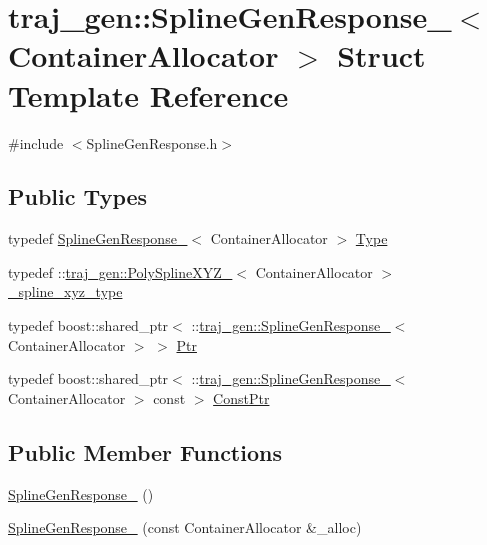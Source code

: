 \hypertarget{structtraj__gen_1_1_spline_gen_response__}{}\section{traj\+\_\+gen\+:\+:Spline\+Gen\+Response\+\_\+$<$ Container\+Allocator $>$ Struct Template Reference}
\label{structtraj__gen_1_1_spline_gen_response__}


{\ttfamily \#include $<$Spline\+Gen\+Response.\+h$>$}

\subsection*{Public Types}
\begin{DoxyCompactItemize}
\item 
typedef \hyperlink{structtraj__gen_1_1_spline_gen_response__}{Spline\+Gen\+Response\+\_\+}$<$ Container\+Allocator $>$ \hyperlink{structtraj__gen_1_1_spline_gen_response___a033ff4c35ebdd04211abb4cda0c40447}{Type}
\item 
typedef \+::\hyperlink{structtraj__gen_1_1_poly_spline_x_y_z__}{traj\+\_\+gen\+::\+Poly\+Spline\+X\+Y\+Z\+\_\+}$<$ Container\+Allocator $>$ \hyperlink{structtraj__gen_1_1_spline_gen_response___a2b22348645511f99126b3078bf1ae10d}{\+\_\+spline\+\_\+xyz\+\_\+type}
\item 
typedef boost\+::shared\+\_\+ptr$<$ \+::\hyperlink{structtraj__gen_1_1_spline_gen_response__}{traj\+\_\+gen\+::\+Spline\+Gen\+Response\+\_\+}$<$ Container\+Allocator $>$ $>$ \hyperlink{structtraj__gen_1_1_spline_gen_response___aac2c39221865ccbf6d203ded52dc9e51}{Ptr}
\item 
typedef boost\+::shared\+\_\+ptr$<$ \+::\hyperlink{structtraj__gen_1_1_spline_gen_response__}{traj\+\_\+gen\+::\+Spline\+Gen\+Response\+\_\+}$<$ Container\+Allocator $>$ const  $>$ \hyperlink{structtraj__gen_1_1_spline_gen_response___a98d2b3fc57ca918923c480b748f41fd0}{Const\+Ptr}
\end{DoxyCompactItemize}
\subsection*{Public Member Functions}
\begin{DoxyCompactItemize}
\item 
\hyperlink{structtraj__gen_1_1_spline_gen_response___aa0e154460ac96a5e99edd2c1d67e148b}{Spline\+Gen\+Response\+\_\+} ()
\item 
\hyperlink{structtraj__gen_1_1_spline_gen_response___a84820e728ca6c524e35dd1e4a8368220}{Spline\+Gen\+Response\+\_\+} (const Container\+Allocator \&\+\_\+alloc)
\end{DoxyCompactItemize}

